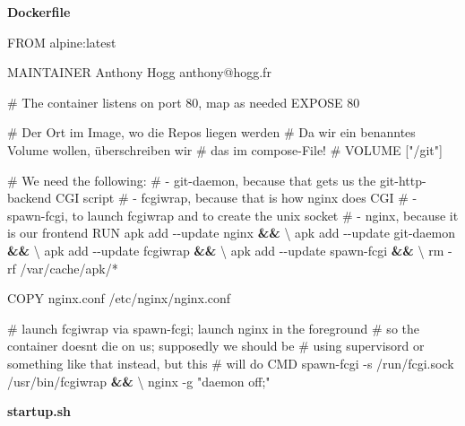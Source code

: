\documentclass[
  ngerman,
  letterpaper,
  DIV=11]{scrreprt}
\newenvironment{Shaded}{\begin{snugshade}}{\end{snugshade}}
\newcommand{\AttributeTok}[1]{\textcolor[rgb]{0.40,0.45,0.13}{#1}}
\newcommand{\BuiltInTok}[1]{\textcolor[rgb]{0.00,0.23,0.31}{#1}}
\newcommand{\CommentTok}[1]{\textcolor[rgb]{0.37,0.37,0.37}{#1}}
\newcommand{\DataTypeTok}[1]{\textcolor[rgb]{0.68,0.00,0.00}{#1}}
\newcommand{\ExtensionTok}[1]{\textcolor[rgb]{0.00,0.23,0.31}{#1}}
\newcommand{\FunctionTok}[1]{\textcolor[rgb]{0.28,0.35,0.67}{#1}}
\newcommand{\KeywordTok}[1]{\textcolor[rgb]{0.00,0.23,0.31}{\textbf{#1}}}
\newcommand{\NormalTok}[1]{\textcolor[rgb]{0.00,0.23,0.31}{#1}}
\newcommand{\PreprocessorTok}[1]{\textcolor[rgb]{0.68,0.00,0.00}{#1}}
\newcommand{\StringTok}[1]{\textcolor[rgb]{0.13,0.47,0.30}{#1}}
\newcommand{\VariableTok}[1]{\textcolor[rgb]{0.07,0.07,0.07}{#1}}
\begin{document}
\textbf{Dockerfile}

\begin{Shaded}
\begin{Highlighting}[]
\ExtensionTok{FROM}\NormalTok{ alpine:latest}

\ExtensionTok{MAINTAINER}\NormalTok{ Anthony Hogg anthony@hogg.fr}

\CommentTok{\# The container listens on port 80, map as needed}
\ExtensionTok{EXPOSE}\NormalTok{ 80}

\CommentTok{\# Der Ort im Image, wo die Repos liegen werden}
\CommentTok{\# Da wir ein benanntes Volume wollen, überschreiben wir }
\CommentTok{\# das im compose{-}File!}
\CommentTok{\# VOLUME ["/git"]}

\CommentTok{\# We need the following:}
\CommentTok{\# {-} git{-}daemon, because that gets us the git{-}http{-}backend CGI script}
\CommentTok{\# {-} fcgiwrap, because that is how nginx does CGI}
\CommentTok{\# {-} spawn{-}fcgi, to launch fcgiwrap and to create the unix socket}
\CommentTok{\# {-} nginx, because it is our frontend}
\ExtensionTok{RUN}\NormalTok{ apk add }\AttributeTok{{-}{-}update}\NormalTok{ nginx }\KeywordTok{\&\&} \DataTypeTok{\textbackslash{}}
    \ExtensionTok{apk}\NormalTok{ add }\AttributeTok{{-}{-}update}\NormalTok{ git{-}daemon }\KeywordTok{\&\&} \DataTypeTok{\textbackslash{}}
    \ExtensionTok{apk}\NormalTok{ add }\AttributeTok{{-}{-}update}\NormalTok{ fcgiwrap }\KeywordTok{\&\&} \DataTypeTok{\textbackslash{}}
    \ExtensionTok{apk}\NormalTok{ add }\AttributeTok{{-}{-}update}\NormalTok{ spawn{-}fcgi }\KeywordTok{\&\&} \DataTypeTok{\textbackslash{}}
    \FunctionTok{rm} \AttributeTok{{-}rf}\NormalTok{ /var/cache/apk/}\PreprocessorTok{*}

\ExtensionTok{COPY}\NormalTok{ nginx.conf /etc/nginx/nginx.conf}

\CommentTok{\# launch fcgiwrap via spawn{-}fcgi; launch nginx in the foreground}
\CommentTok{\# so the container doesn\textquotesingle{}t die on us; supposedly we should be}
\CommentTok{\# using supervisord or something like that instead, but this}
\CommentTok{\# will do}
\ExtensionTok{CMD}\NormalTok{ spawn{-}fcgi }\AttributeTok{{-}s}\NormalTok{ /run/fcgi.sock /usr/bin/fcgiwrap }\KeywordTok{\&\&} \DataTypeTok{\textbackslash{}}
    \ExtensionTok{nginx} \AttributeTok{{-}g} \StringTok{"daemon off;"}
\end{Highlighting}
\end{Shaded}

\textbf{startup.sh}

\begin{Shaded}
\end{Shaded}
\end{document}
